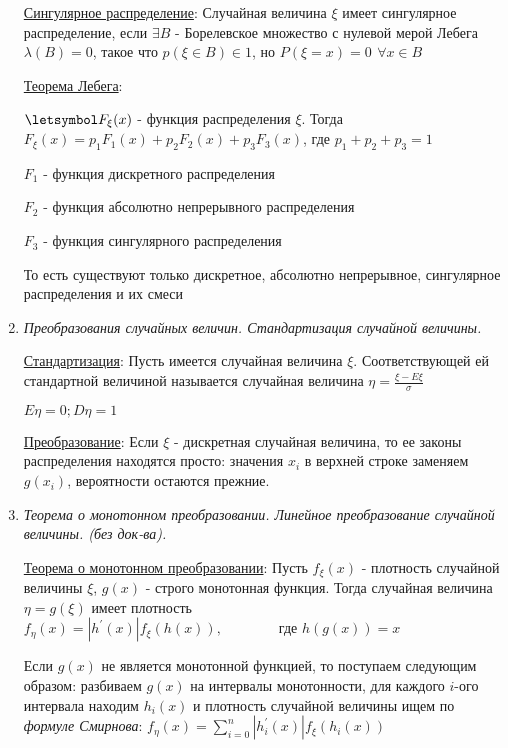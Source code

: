 \begin{enumerate}
    \hyperlink{singulardistribution}{Сингулярное распределение}: Случайная величина $\xi$ имеет сингулярное распределение, если $\exists B$ - Борелевское множество с нулевой мерой Лебега $\lambda(B) = 0$, такое что $p(\xi \in B) \in 1$, но $P(\xi = x) = 0 \ \, \forall x \in B$

    \hyperlink{lebesguetheorem}{Теорема Лебега}: 

    $\letsymbol F_\xi(x)$ - функция распределения $\xi$. Тогда $F_\xi(x) = p_1 F_1(x) + p_2 F_2(x) + p_3 F_3(x)$, где $p_1 + p_2 + p_3 = 1$

    $F_1$ - функция дискретного распределения

    $F_2$ - функция абсолютно непрерывного распределения

    $F_3$ - функция сингулярного распределения

    То есть существуют только дискретное, абсолютно непрерывное, сингулярное распределения и их смеси

    \item \textit{Преобразования случайных величин. Стандартизация случайной величины. }

    \hyperlink{standardizationofrandomvalue}{Стандартизация}: Пусть имеется случайная величина $\xi$. Соответствующей ей стандартной величиной называется
    случайная величина $\eta = \frac{\xi - E\xi}{\sigma}$

    $E\eta = 0; D\eta = 1$

    \hyperlink{randomvaluetransformation}{Преобразование}: Если $\xi$ - дискретная случайная величина, то ее законы распределения находятся просто: значения $x_i$ в верхней строке заменяем $g(x_i)$, вероятности остаются прежние.
    
    \item \textit{Теорема о монотонном преобразовании. Линейное преобразование случайной величины. (без док-ва).}
    
    \hyperlink{monotonoustransformationtheorem}{Теорема о монотонном преобразовании}: \Ths Пусть $f_\xi(x)$ - плотность случайной величины $\xi$, $g(x)$ - строго монотонная функция. Тогда 
    случайная величина $\eta = g(\xi)$ имеет плотность $f_\eta(x) = |h^\prime(x)| f_\xi(h(x)), \qquad\qquad \text{где } h(g(x)) = x$

    Если $g(x)$ не является монотонной функцией, то поступаем следующим образом: разбиваем $g(x)$ на интервалы монотонности, 
    для каждого $i$-ого интервала находим $h_i(x)$ и плотность случайной величины ищем по \textit{формуле Смирнова}: 
    $f_\eta(x) = \sum_{i = 0}^n |h_i^\prime(x)| f_\xi(h_i(x))$
    

\end{enumerate}
